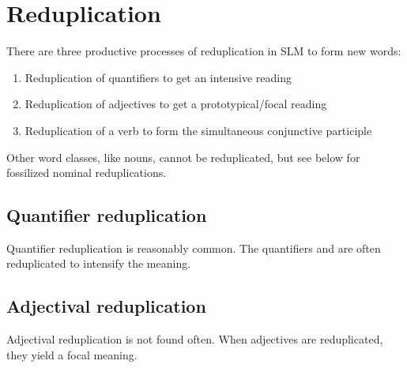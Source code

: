 \section{Reduplication}\label{sec:wofo:Reduplication}
There are three productive processes of reduplication in SLM to form new words:

\begin{enumerate}
 \item Reduplication of quantifiers to get an intensive reading
 \item Reduplication of adjectives to get a prototypical/focal reading
 \item Reduplication of a verb to form the simultaneous conjunctive participle
\end{enumerate}

Other word classes, like  nouns, cannot be reduplicated, but see below for fossilized nominal reduplications.


\subsection{Quantifier reduplication}\label{sec:wofo:Quantifierreduplication}
Quantifier reduplication is reasonably common.
The quantifiers  and  are often reduplicated to intensify the meaning.



\subsection{Adjectival reduplication}\label{sec:wofo:Adjectivalreduplication}
Adjectival reduplication is not found often. When adjectives are reduplicated, they yield a focal meaning.


